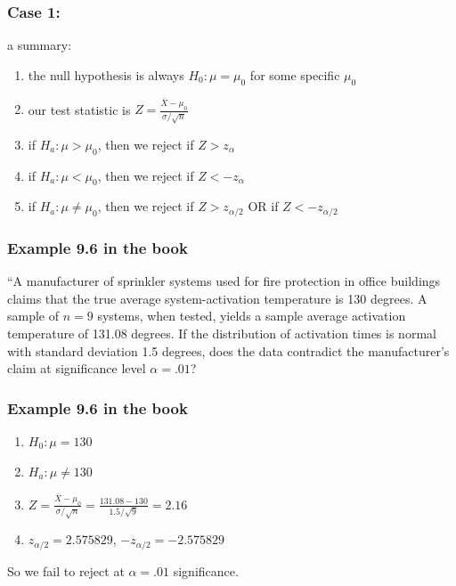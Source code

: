 \documentclass{beamer}
\begin{document}
\begin{frame}
\frametitle{Case 1:}

a summary:

\begin{enumerate}
\item the null hypothesis is always $H_0: \mu = \mu_0$ for some specific $\mu_0$
\item our test statistic is $Z = \frac{\bar{X}-\mu_0}{\sigma/ \sqrt{n}}$
\item if $H_a: \mu > \mu_0$, then we reject if $Z > z_{\alpha}$
\item if $H_a: \mu < \mu_0$, then we reject if $Z < -z_{\alpha}$
\item if $H_a: \mu \neq \mu_0$, then we reject if $Z > z_{\alpha/2}$ OR if $Z < -z_{\alpha/2}$
\end{enumerate}


\end{frame}


\begin{frame}
\frametitle{Example 9.6 in the book}

``A manufacturer of sprinkler systems used for fire protection in office buildings claims that the true average system-activation temperature is 130 degrees. A sample of $n=9$ systems, when tested, yields a sample average activation temperature of 131.08 degrees. If the distribution of activation times is normal with standard deviation 1.5 degrees, does the data contradict the manufacturer's claim at significance level $\alpha = .01$?

\end{frame}

\begin{frame}
\frametitle{Example 9.6 in the book}

\begin{enumerate}
\item $H_0: \mu = 130$ \pause
\item $H_a: \mu \neq 130$ \pause
\item $Z = \frac{\bar{X} - \mu_0}{\sigma / \sqrt{n}} = \frac{131.08 - 130}{1.5 / \sqrt{9}} = 2.16$
\item $z_{\alpha/2} = 2.575829$, $-z_{\alpha/2} = -2.575829$
\end{enumerate}

So we fail to reject at $\alpha = .01$ significance.

\end{frame}
\end{document}
